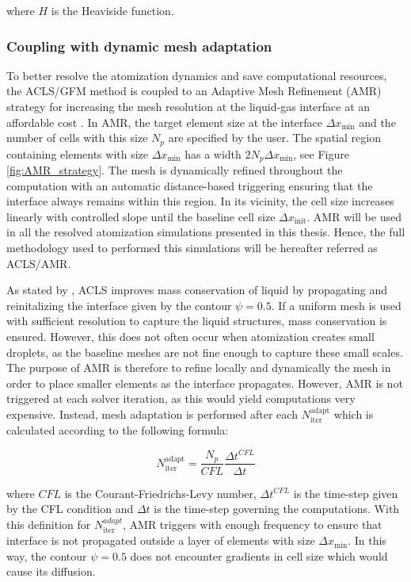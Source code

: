 where $H$ is the Heaviside function.


\subsubsection*{Coupling with dynamic mesh adaptation}

To better resolve the atomization dynamics and save computational resources, the ACLS/GFM method is coupled to an Adaptive Mesh Refinement (AMR) strategy for increasing the mesh resolution at the liquid-gas interface at an affordable cost . In AMR, the target element size at the interface $\Delta x_\mathrm{min}$ and  the number of cells with this size $N_p$ are specified by the user. The spatial region containing elements with size $\Delta x_\mathrm{min}$ has a width $2 N_p\Delta x_\mathrm{min}$, see Figure \ref{fig:AMR_strategy}. The mesh is dynamically refined throughout the computation with an automatic distance-based triggering ensuring that the interface always remains within this region. In its vicinity, the cell size increases linearly with controlled slope until the baseline cell size $\Delta x_\mathrm{init}$. AMR will be used in all the resolved atomization simulations presented in this thesis. Hence, the full methodology used to performed this simulations will be hereafter referred as ACLS/AMR.

As stated by , ACLS improves mass conservation of liquid by propagating and reinitalizing the interface given by the contour $\psi = 0.5$. If a uniform mesh is used with sufficient resolution to capture the liquid structures, mass conservation is ensured. However, this does not often occur when atomization creates small droplets, as the baseline meshes are not fine enough to capture these small scales. The purpose of AMR is therefore to refine locally and dynamically the mesh in order to place smaller elements as the interface propagates. However, AMR is not triggered at each solver iteration, as this would yield computations very expensive. Instead, mesh adaptation is performed after each $N_\mathrm{iter}^\mathrm{adapt}$ which is calculated according to the following formula:

\begin{equation}
\label{eq:ch2_N_iter_adapt_AMR}
N_\mathrm{iter}^\mathrm{adapt} = \frac{N_p}{CFL} \frac{\Delta t^{CFL}}{\Delta t}
\end{equation}

where $CFL$ is the Courant-Friedrichs-Levy number, $\Delta t^{CFL}$ is the time-step given by the CFL condition and $\Delta t$ is the time-step governing the computations.  With this definition for $N_\mathrm{iter}^{adapt}$, AMR triggers with enough frequency to ensure that interface is not propagated outside a layer of elements with size $\Delta x_\mathrm{min}$. In this way, the contour $\psi = 0.5$ does not encounter gradients in cell size which would cause its diffusion.

